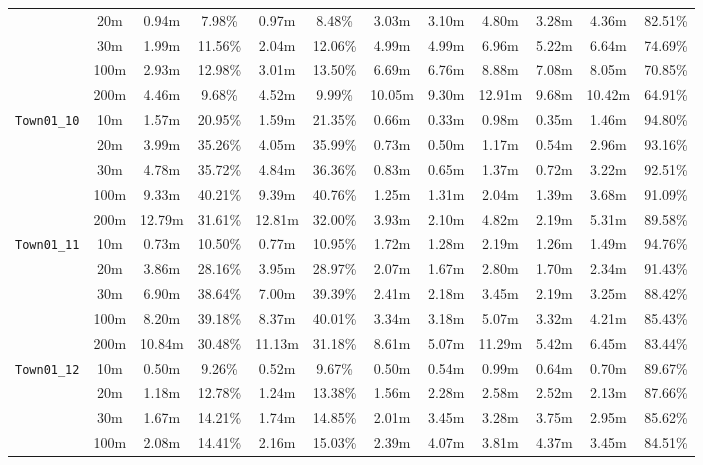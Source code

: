 \begin{table}
{\begin{tabular}{@{}cccccccccccc@{}}
      & 20m & 0.94m & 7.98\% & 0.97m & 8.48\% & 3.03m & 3.10m & 4.80m & 3.28m & 4.36m & 82.51\% \\
      & 30m & 1.99m & 11.56\% & 2.04m & 12.06\% & 4.99m & 4.99m & 6.96m & 5.22m & 6.64m & 74.69\% \\
      & 100m & 2.93m & 12.98\% & 3.01m & 13.50\% & 6.69m & 6.76m & 8.88m & 7.08m & 8.05m & 70.85\% \\
      & 200m & 4.46m & 9.68\% & 4.52m & 9.99\% & 10.05m & 9.30m & 12.91m & 9.68m & 10.42m & 64.91\% \\
      \midrule
      \multirow{5}{*}{\Verb|Town01_10|} & 10m & 1.57m & 20.95\% & 1.59m & 21.35\% & 0.66m & 0.33m & 0.98m & 0.35m & 1.46m & 94.80\% \\
      & 20m & 3.99m & 35.26\% & 4.05m & 35.99\% & 0.73m & 0.50m & 1.17m & 0.54m & 2.96m & 93.16\% \\
      & 30m & 4.78m & 35.72\% & 4.84m & 36.36\% & 0.83m & 0.65m & 1.37m & 0.72m & 3.22m & 92.51\% \\
      & 100m & 9.33m & 40.21\% & 9.39m & 40.76\% & 1.25m & 1.31m & 2.04m & 1.39m & 3.68m & 91.09\% \\
      & 200m & 12.79m & 31.61\% & 12.81m & 32.00\% & 3.93m & 2.10m & 4.82m & 2.19m & 5.31m & 89.58\% \\
      \midrule
      \multirow{5}{*}{\Verb|Town01_11|} & 10m & 0.73m & 10.50\% & 0.77m & 10.95\% & 1.72m & 1.28m & 2.19m & 1.26m & 1.49m & 94.76\% \\
      & 20m & 3.86m & 28.16\% & 3.95m & 28.97\% & 2.07m & 1.67m & 2.80m & 1.70m & 2.34m & 91.43\% \\
      & 30m & 6.90m & 38.64\% & 7.00m & 39.39\% & 2.41m & 2.18m & 3.45m & 2.19m & 3.25m & 88.42\% \\
      & 100m & 8.20m & 39.18\% & 8.37m & 40.01\% & 3.34m & 3.18m & 5.07m & 3.32m & 4.21m & 85.43\% \\
      & 200m & 10.84m & 30.48\% & 11.13m & 31.18\% & 8.61m & 5.07m & 11.29m & 5.42m & 6.45m & 83.44\% \\
      \midrule
      \multirow{5}{*}{\Verb|Town01_12|} & 10m & 0.50m & 9.26\% & 0.52m & 9.67\% & 0.50m & 0.54m & 0.99m & 0.64m & 0.70m & 89.67\% \\
      & 20m & 1.18m & 12.78\% & 1.24m & 13.38\% & 1.56m & 2.28m & 2.58m & 2.52m & 2.13m & 87.66\% \\
      & 30m & 1.67m & 14.21\% & 1.74m & 14.85\% & 2.01m & 3.45m & 3.28m & 3.75m & 2.95m & 85.62\% \\
      & 100m & 2.08m & 14.41\% & 2.16m & 15.03\% & 2.39m & 4.07m & 3.81m & 4.37m & 3.45m & 84.51\% \\

\end{tabular}}
\end{table}
